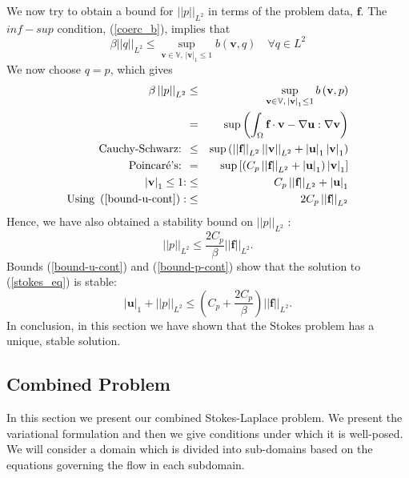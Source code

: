 \documentclass[12pt,a4paper]{article}
\theoremstyle{definition}
\begin{document}
We now try to obtain a bound for $\left|\left|p\right|\right|_{L^2}$ in terms of the problem data, $\textbf{f}$.  The $inf-sup$ condition, (\ref{coerc_b}), implies that
\begin{equation}\nonumber
\beta \left|\left|q\right|\right|_{L^2}\leq \sup_{\textbf{v}\in \mathbb{V}, \,\left|\textbf{v}\right|_{1}\leq1}  b\left(\textbf{v},q\right)\quad  \forall q \in L^2
\end{equation}
We now choose $q=p$, which gives 
\begin{eqnarray}\nonumber
\beta \left|\left|p\right|\right|_{L^2} &\leq& \sup_{\textbf{v}\in \mathbb{V}, \,\left|\textbf{v}\right|_1\leq1}  b\left(\textbf{v},p\right)\\\nonumber
&=& \sup \left(\int_{\Omega}\textbf{f}\cdot\textbf{v} -\nabla\textbf{u}:\nabla\textbf{v}\right)\\\nonumber
\text{Cauchy-Schwarz: }&\leq& \sup \left(\left|\left|\textbf{f}\right| \right|_{L^2} \left|\left|\textbf{v}\right|\right|_{L^2}+\left|\textbf{u}\right|_1 \left|\textbf{v}\right|_1\right)\\\nonumber
\text{Poincar\'e's: }&=&\sup \left[\left(C_p\left|\left|\textbf{f}\right| \right|_{L^2}+ \left|\textbf{u}\right|_1\right) \left|\textbf{v}\right|_1\right] \\\nonumber
\left|\textbf{v}\right|_1\leq 1\text{:} &\leq&C_p\left|\left|\textbf{f}\right| \right|_{L^2}+ \left|\textbf{u}\right|_1\\\nonumber
\text{Using }\left(\ref{bound-u-cont}\right):&\leq&2C_p\left|\left|\textbf{f}\right| \right|_{L^2}
\end{eqnarray}
Hence, we have also obtained a stability bound on $\left|\left|p\right|\right|_{L^2}$ :
\begin{equation}\label{bound-p-cont}
\left|\left|p\right|\right|_{L^2} \leq \frac{2C_p}{\beta}\left|\left|\textbf{f}\right|\right|_{L^2}.
\end{equation}
Bounds (\ref{bound-u-cont}) and (\ref{bound-p-cont}) show that the solution to (\ref{stokes_eq}) is stable:
\begin{equation}
\left|\textbf{u}\right|_1+\left|\left|p\right|\right|_{L^2} \leq\left( C_p+\frac{2C_p}{\beta}\right)\left|\left|\textbf{f}\right|\right|_{L^2}.
\end{equation}
In conclusion, in this section we have shown that the Stokes problem has a unique, stable solution.
\subsection{Combined Problem}\label{sec_adaptivity}
In this section we present our combined Stokes-Laplace problem.  We present the variational formulation and then we give conditions under which it is well-posed.  We will consider a domain which is divided into sub-domains based on the equations governing the flow in each subdomain.
\end{document}
